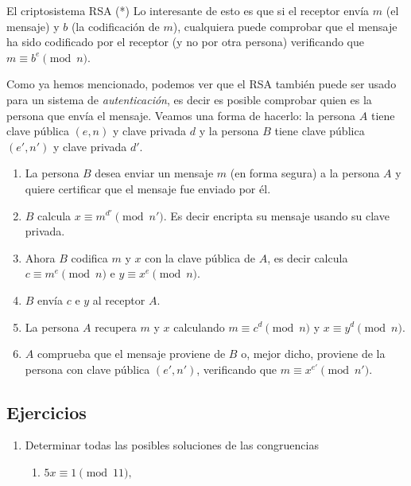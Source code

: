 \begin{section}{El criptosistema RSA (*)}
Lo interesante de esto es que si el receptor envía $m$ (el mensaje) y $b$ (la codificación de $m$), cualquiera puede comprobar que el mensaje ha sido codificado por el receptor (y no por otra persona) verificando  que   $m \equiv b^e \pmod{n}$.     


\begin{ejemplo}
Como ya hemos mencionado, podemos ver que el RSA también puede ser usado para un sistema de \emph{autenticación}, es decir es posible comprobar quien es la persona que envía el mensaje. Veamos una forma de hacerlo: la persona $A$ tiene clave pública $(e,n)$ y clave privada $d$ y   la persona $B$  tiene clave pública $(e',n')$ y clave privada $d'$. 

\begin{enumerate}[label=(\alph*)]
\item  La persona $B$ desea enviar un mensaje $m$ (en forma segura) a la persona $A$ y quiere certificar que el mensaje fue enviado por él.
\item  $B$ calcula $x \equiv m^{d'} \pmod{n'}$. Es decir encripta su mensaje usando su  clave privada.
\item  Ahora $B$ codifica $m$ y $x$ con la clave pública de $A$, es decir calcula $c \equiv m^{e} \pmod{n}$ e  $y \equiv x^e \pmod{n}$. 
\item  $B$ envía $c$ e $y$ al receptor $A$.
\item  La persona $A$ recupera $m$ y $x$ calculando  $m \equiv c^d \pmod{n}$ y  $x \equiv y^d \pmod{n}$. 
\item  $A$ comprueba que el mensaje  proviene de $B$ o, mejor dicho, proviene de la persona con clave pública $(e',n')$, verificando que $m \equiv x^{e'} \pmod{n'}$. 
\end{enumerate}



\end{ejemplo}
\section{Ejercicios}
\begin{enumerate}
\item Determinar todas las posibles soluciones de las congruencias
\begin{enumerate}
	\item  $5x\equiv1 \pmod{11},$
	

\end{enumerate}
\end{enumerate}
\end{section}
